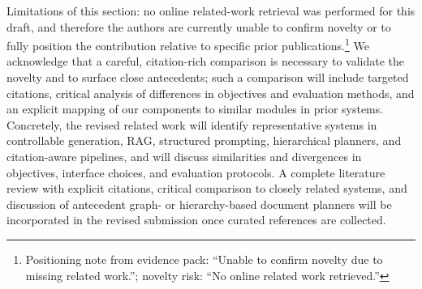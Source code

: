 Limitations of this section: no online related-work retrieval was performed for this draft, and therefore the authors are currently unable to confirm novelty or to fully position the contribution relative to specific prior publications.\footnote{Positioning note from evidence pack: ``Unable to confirm novelty due to missing related work.''; novelty risk: ``No online related work retrieved.''} We acknowledge that a careful, citation-rich comparison is necessary to validate the novelty and to surface close antecedents; such a comparison will include targeted citations, critical analysis of differences in objectives and evaluation methods, and an explicit mapping of our components to similar modules in prior systems. Concretely, the revised related work will identify representative systems in controllable generation, RAG, structured prompting, hierarchical planners, and citation-aware pipelines, and will discuss similarities and divergences in objectives, interface choices, and evaluation protocols. A complete literature review with explicit citations, critical comparison to closely related systems, and discussion of antecedent graph- or hierarchy-based document planners will be incorporated in the revised submission once curated references are collected.